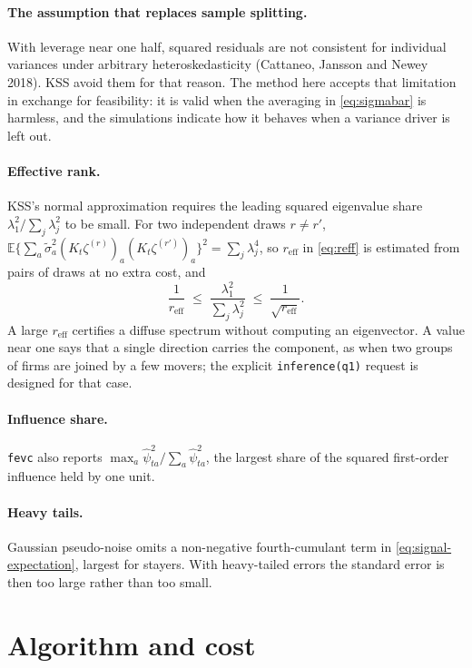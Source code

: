 \documentclass[11pt]{article}
\newcommand{\E}{\mathbb{E}}
\newcommand{\fevc}{\texttt{fevc}}
\newcommand{\reff}{r_{\mathrm{eff}}}
\begin{document}
\paragraph{The assumption that replaces sample splitting.} With leverage near
one half, squared residuals are not consistent for individual variances under
arbitrary heteroskedasticity (Cattaneo, Jansson and Newey 2018). KSS avoid
them for that reason. The method here accepts that limitation in exchange for
feasibility: it is valid when the averaging in \eqref{eq:sigmabar} is
harmless, and the simulations indicate how it behaves when a variance driver
is left out.

\paragraph{Effective rank.} KSS's normal approximation requires the leading
squared eigenvalue share $\lambda_1^2/\sum_j\lambda_j^2$ to be small. For two
independent draws $r\neq r'$,
$\E\{\sum_a\tilde\sigma_a^2(K_t\zeta^{(r)})_a(K_t\zeta^{(r')})_a\}^2
=\sum_j\lambda_j^4$, so $\reff$ in \eqref{eq:reff} is estimated from pairs of
draws at no extra cost, and
\begin{equation}\label{eq:bracket}
 \frac1{\reff}\;\le\;\frac{\lambda_1^2}{\sum_j\lambda_j^2}\;\le\;
 \frac1{\sqrt{\reff}} .
\end{equation}
A large $\reff$ certifies a diffuse spectrum without computing an
eigenvector. A value near one says that a single direction carries the
component, as when two groups of firms are joined by a few movers; the
explicit \texttt{inference(q1)} request is designed for that case.

\paragraph{Influence share.} \fevc{} also reports
$\max_a\hat\psi_{ta}^2/\sum_a\hat\psi_{ta}^2$, the largest share of the
squared first-order influence held by one unit.

\paragraph{Heavy tails.} Gaussian pseudo-noise omits a non-negative
fourth-cumulant term in \eqref{eq:signal-expectation}, largest for stayers.
With heavy-tailed errors the standard error is then too large rather than too
small.

\section{Algorithm and cost}\label{sec:algorithm}
\end{document}
